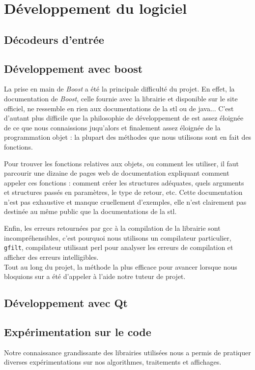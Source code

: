 \section{Développement du logiciel}
\subsection{Décodeurs d'entrée}
\subsection{Développement avec boost}
La prise en main de \textit{Boost} a été la principale difficulté du projet. En effet, la documentation de \textit{Boost}, celle fournie avec la librairie et disponible sur le site officiel, ne ressemble en rien aux documentations de la stl ou de java... C'est d'autant plus difficile que la philosophie de développement de \boost est assez éloignée de ce que nous connaissions juqu'alors et finalement assez éloignée de la programmation objet : la plupart des méthodes que nous utilisons sont en fait des fonctions.

Pour trouver les fonctions relatives aux objets, ou comment les utiliser, il faut parcourir une dizaine de pages web de documentation expliquant  comment appeler ces fonctions : comment créer les structures adéquates, quels arguments et structures passés en paramètres, le type de retour, etc. Cette documentation n'est pas exhaustive et manque cruellement d'exemples, elle n'est clairement pas destinée au même public que la documentations de la stl.

Enfin, les erreurs retournées par gcc à la compilation de la librairie sont incompréhensibles, c'est pourquoi nous utilisons un compilateur particulier, \verb|gfilt|, compilateur utilisant perl pour analyser les erreurs de compilation et afficher des erreurs intelligibles. 
~\\

Tout au long du projet, la méthode la plus efficace pour avancer lorsque nous bloquions sur \boost a été d'appeler à l'aide notre tuteur de projet. 

\subsection{D\'eveloppement avec Qt}


\subsection{Expérimentation sur le code}
Notre connaissance grandissante des librairies utilisées nous a permis de pratiquer diverses expérimentations sur nos algorithmes, traitements et affichages.


